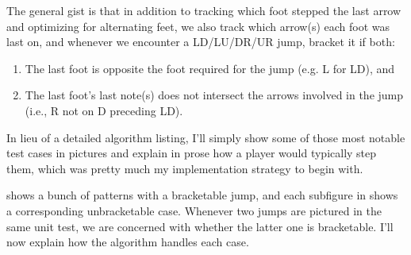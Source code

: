 \documentclass[10pt]{sigplanconf}
\begin{document}
The general gist is that in addition to tracking which foot stepped the last arrow and optimizing for alternating feet,
we also track which arrow(s) each foot was last on,
and whenever we encounter a LD/LU/DR/UR jump, bracket it if both:
\begin{enumerate}
	\item The last foot is opposite the foot required for the jump (e.g. L for LD), and
	\item The last foot's last note(s) does not intersect the arrows involved in the jump (i.e., R not on D preceding LD).
\end{enumerate}
In lieu of a detailed algorithm listing, I'll simply show some of those most notable test cases in pictures and explain in prose how a player would typically step them,
which was pretty much my implementation strategy to begin with.

 shows a bunch of patterns with a bracketable jump,
and each subfigure in  shows a corresponding unbracketable case.
Whenever two jumps are pictured in the same unit test, we are concerned with whether the latter one is bracketable.
I'll now explain how the algorithm handles each case.
\end{document}
